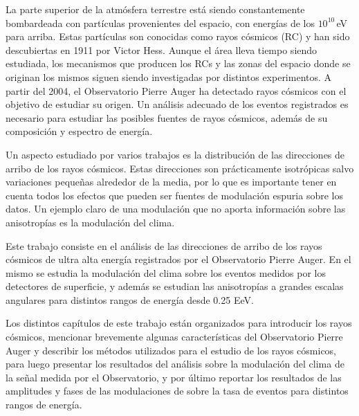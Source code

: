 



La parte superior de la atmósfera terrestre está siendo constantemente bombardeada con partículas provenientes del espacio, con energías de los $10^{10}\,$eV para arriba. Estas partículas son conocidas como rayos cósmicos (RC) y han sido descubiertas en 1911 por Victor Hess. Aunque el área lleva tiempo siendo estudiada, los mecanismos que producen los RCs y las zonas del espacio donde se originan los mismos siguen siendo investigadas por distintos experimentos.  A partir del 2004, el Observatorio Pierre Auger ha detectado rayos cósmicos con el objetivo de estudiar su origen. Un análisis adecuado de los eventos registrados es necesario para estudiar las posibles fuentes de rayos cósmicos, además de su composición y espectro de energía.

Un aspecto estudiado por varios trabajos \cite{collaboration2013pierre} \cite{data} es la distribución de las direcciones de arribo de los rayos cósmicos. Estas direcciones son prácticamente isotrópicas salvo variaciones pequeñas alrededor de la media, por lo que es importante tener en cuenta todos los efectos que pueden ser fuentes de modulación espuria sobre los datos. Un ejemplo claro de una modulación que no aporta información sobre las anisotropías es la modulación del clima.

Este trabajo consiste en el análisis de las direcciones de arribo de los rayos cósmicos de ultra alta energía registrados por el Observatorio Pierre Auger. En el mismo se estudia la modulación del clima sobre los eventos medidos por los detectores de superficie, y además se estudian las anisotropías a grandes escalas angulares para distintos rangos de energía desde 0.25 EeV.  

Los distintos capítulos de este trabajo están organizados para introducir los rayos cósmicos, mencionar brevemente algunas características del Observatorio Pierre Auger y describir los métodos utilizados para el estudio de los rayos cósmicos, para luego presentar los resultados del análisis sobre la modulación del clima de la señal medida por el Observatorio, y por último reportar los resultados de las amplitudes y fases de las modulaciones de sobre la tasa de eventos para distintos rangos de energía.
